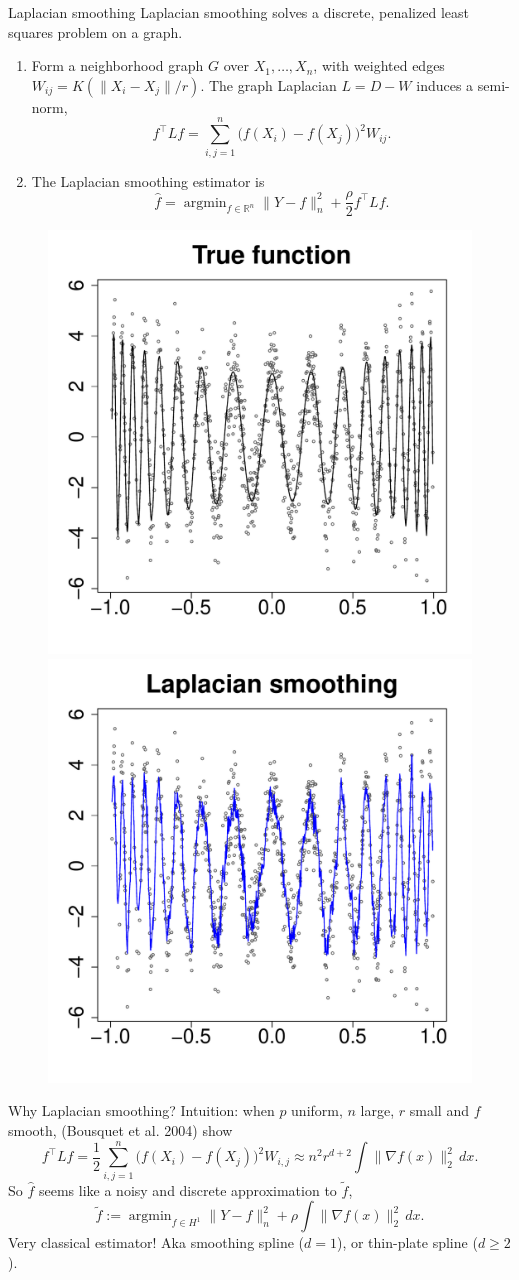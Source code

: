 \documentclass[xcolor=dvipsnames]{beamer}
\newcommand{\Reals}{\mathbb{R}}
\newcommand{\wh}[1]{\widehat{#1}}
\newcommand{\wt}[1]{\widetilde{#1}}
\DeclareMathOperator*{\argmin}{argmin}
\begin{document}
\begin{frame}{Laplacian smoothing}
Laplacian smoothing solves a discrete, penalized least squares problem on a graph.
\pause
\begin{enumerate}
	\item  Form a \alert{neighborhood graph} $G$ over $X_1,\ldots,X_n$, with weighted edges $W_{ij} = K(\|X_i - X_j\|/r)$. The \alert{graph Laplacian} $L = D - W$ induces a semi-norm,
	\begin{equation*}
	f^{\top} L f = \sum_{i,j = 1}^{n} \bigl(f(X_i) - f(X_j)\bigr)^2 W_{ij}.
	\end{equation*}
	\pause
	\item The \alert{Laplacian smoothing} estimator is
	\begin{equation*}
	\wh{f} = \argmin_{f \in \Reals^n} \|Y - f\|_n^2 + \frac{\rho}{2} f^{\top} L f.
	\end{equation*}
\end{enumerate}
\begin{figure}
	\centering
	\includegraphics[width=.25\textwidth]{figures/wiggly_cosine/regression_function_1.pdf}
	\includegraphics[width=.25\textwidth]{figures/wiggly_cosine/laplacian_smoothing_estimate_1.pdf} 
\end{figure}
\end{frame}

\begin{frame}{Why Laplacian smoothing?}
Intuition: when $p$ uniform, $n$ large, $r$ small and $f$ smooth, {(Bousquet et al. 2004)} show
\begin{equation*}
f^{\top} L f = \frac{1}{2}\sum_{i,j = 1}^{n} \bigl(f(X_i) - f(X_j)\bigr)^2 W_{i,j} \approx n^2 r^{d + 2} \int \|\nabla f(x)\|_2^2 \,dx.
\end{equation*}
\pause
So $\wh{f}$ seems like a noisy and discrete approximation to $\wt{f}$,
\begin{equation*}
\widetilde{f} := \argmin_{f \in H^1} \|Y - f\|_n^2 + \rho \int \|\nabla f(x)\|_2^2  \,dx.
\end{equation*}
Very classical estimator! Aka \alert{smoothing spline} ($d = 1$), or \alert{thin-plate spline} ($d \geq 2$).
\end{frame}
\end{document}
